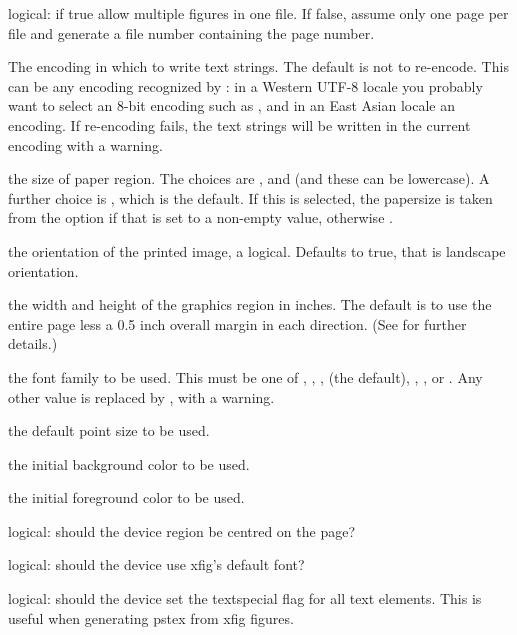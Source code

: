 \begin{Arguments}
\begin{ldescription}
\item[\code{onefile}] logical: if true allow multiple figures
in one file. If false, assume only one page per file and generate a
file number containing the page number.
\item[\code{encoding}] The encoding in which to write text strings.  The
default is not to re-encode.  This can be any encoding recognized by
: in a Western UTF-8 locale you probably want to
select an 8-bit encoding such as , and in an East Asian
locale an  encoding.  If re-encoding fails, the text
strings will be written in the current encoding with a warning.
\item[\code{paper}] the size of paper region.  The choices
are ,  and  (and these
can be lowercase).  A further choice is , which
is the default.  If this is selected, the papersize is taken
from the option  if that is set to a non-empty
value, otherwise .
\item[\code{horizontal}] the orientation of the printed image, a
logical.  Defaults to true, that is landscape orientation.
\item[\code{width, height}] the width and height of the
graphics region in inches.  The default is to use the entire
page less a 0.5 inch overall margin in each direction.  (See
 for further details.)
\item[\code{family}] the font family to be used.  This must be one
of , , ,
 (the default), ,
,  or
.  Any other value is replaced by
, with a warning.
\item[\code{pointsize}] the default point size to be used.
\item[\code{bg}] the initial background color to be used.
\item[\code{fg}] the initial foreground color to be used.
\item[\code{pagecentre}] logical: should the device region be centred on the
page?
\item[\code{defaultfont}] logical: should the device use xfig's default
font?
\item[\code{textspecial}] logical: should the device set the textspecial flag
for all text elements. This is useful when generating pstex from xfig
figures.
\end{ldescription}
\end{Arguments}
